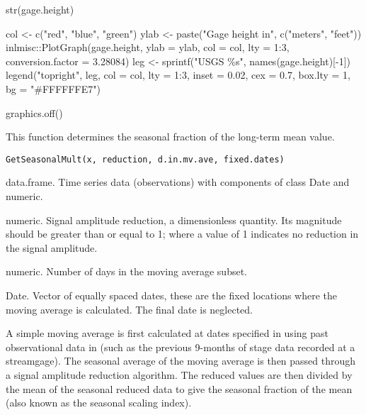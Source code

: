 \documentclass[a4paper]{book}
\begin{document}
%
\begin{Examples}
\begin{ExampleCode}
str(gage.height)

col <- c("red", "blue", "green")
ylab <- paste("Gage height in", c("meters", "feet"))
inlmisc::PlotGraph(gage.height, ylab = ylab, col = col, lty = 1:3,
                   conversion.factor = 3.28084)
leg <- sprintf("USGS \%s", names(gage.height)[-1])
legend("topright", leg, col = col, lty = 1:3, inset = 0.02, cex = 0.7,
       box.lty = 1, bg = "#FFFFFFE7")

graphics.off()

\end{ExampleCode}
\end{Examples}
%
\begin{Description}\relax
This function determines the seasonal fraction of the long-term mean value.
\end{Description}
%
\begin{Usage}
\begin{verbatim}
GetSeasonalMult(x, reduction, d.in.mv.ave, fixed.dates)
\end{verbatim}
\end{Usage}
%
\begin{Arguments}
\begin{ldescription}
\item[\code{x}] data.frame.
Time series data (observations) with components of class Date and numeric.

\item[\code{reduction}] numeric.
Signal amplitude reduction, a dimensionless quantity.
Its magnitude should be greater than or equal to 1;
where a value of 1 indicates no reduction in the signal amplitude.

\item[\code{d.in.mv.ave}] numeric.
Number of days in the moving average subset.

\item[\code{fixed.dates}] Date.
Vector of equally spaced dates, these are the fixed locations where the moving average is calculated.
The final date is neglected.
\end{ldescription}
\end{Arguments}
%
\begin{Details}\relax
A simple moving average is first calculated at dates specified in 
using past observational data in 
(such as the previous 9-months of stage data recorded at a streamgage).
The seasonal average of the moving average is then passed through a signal amplitude reduction algorithm.
The reduced values are then divided by the mean of the seasonal reduced data to give
the seasonal fraction of the mean (also known as the seasonal scaling index).
\end{Details}
\end{document}
